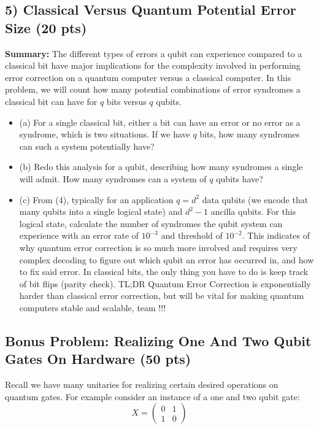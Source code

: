 \documentclass[12pt]{article}
\begin{document}
\subsection*{5) Classical Versus Quantum Potential Error Size (20 pts)}
\textbf{Summary:} The different types of errors a qubit can experience compared to a classical bit have major implications for the complexity involved in performing error correction on a quantum computer versus a classical computer. In this problem, we will count how many potential combinations of error syndromes a classical bit can have for $q$ bits versus $q$ qubits. 
\begin{itemize}
    \item (a) For a single classical bit, either a bit can have an error or no error as a syndrome, which is two situations. If we have $q$ bits, how many syndromes can such a system potentially have?
    \item (b) Redo this analysis for a qubit, describing how many syndromes a single will admit. How many syndromes can a system of $q$ qubits have?
    \item (c) From (4), typically for an application $q=d^2$ data qubits (we encode that many qubits into a single logical state) and $d^2-1$ ancilla qubits. For this logical state, calculate the number of syndromes the qubit system can experience with an error rate of $10^{-3}$ and threshold of $10^{-2}$. This indicates of why quantum error correction is so much more involved and requires very complex decoding to figure out which qubit an error has occurred in, and how to fix said error. In classical bits, the only thing you have to do is keep track of bit flips (parity check). TL;DR Quantum Error Correction is exponentially harder than classical error correction, but will be vital for making quantum computers stable and scalable, team \smiley{}!!!
\end{itemize}





\subsection*{Bonus Problem: Realizing One And Two Qubit Gates On Hardware (50 pts)}
Recall we have many unitaries for realizing certain desired operations on quantum gates. For example consider an instance of a one and two qubit gate: 
\begin{equation}
    X = 
    \begin{pmatrix}
        0 & 1 \\
        1 & 0
    \end{pmatrix}
\label{eq:x_matrix}
\end{equation}
\end{document}
